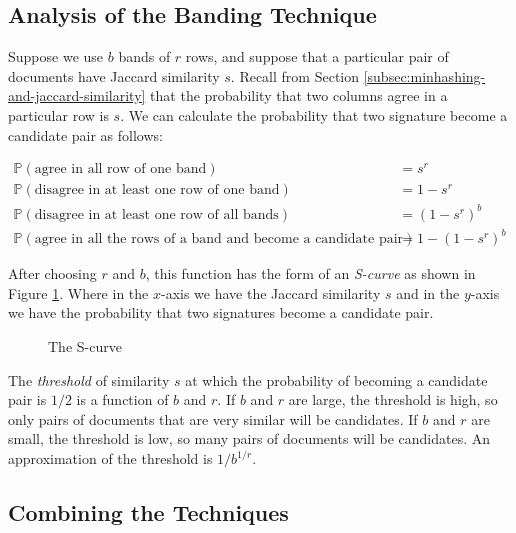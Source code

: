 \subsection{Analysis of the Banding Technique}\label{sec:analysis-banding-technique}

Suppose we use $b$ bands of $r$ rows, and suppose that a particular pair of documents have Jaccard similarity $s$. Recall from Section \ref{subsec:minhashing-and-jaccard-similarity} that the probability that two columns agree in a particular row is $s$. We can calculate the probability that two signature become a candidate pair as follows:

\begin{equation*}
    \begin{split}
        \mathbb{P}(\text{agree in all row of one band}) & = s^r \\
        \mathbb{P}(\text{disagree in at least one row of one band}) & = 1 - s^r \\
        \mathbb{P}(\text{disagree in at least one row of all bands}) & = (1 - s^r)^b \\    
        \mathbb{P}(\text{agree in all the rows of a band and become a candidate pair}) & = 1 - (1 - s^r)^b
    \end{split}
\end{equation*}

After choosing $r$ and $b$, this function has the form of an \textit{S-curve} as shown in Figure \ref{fig:4-s-curve}. Where in the $x$-axis we have the Jaccard similarity $s$ and in the $y$-axis we have the probability that two signatures become a candidate pair. 

\begin{figure}[H]
\centering
\scalebox{1}{
    
}
\caption{The S-curve}
\label{fig:4-s-curve}
\end{figure}

The \textit{threshold} of similarity $s$ at which the probability of becoming a candidate pair is $1/2$ is a function of $b$ and $r$. If $b$ and $r$ are large, the threshold is high, so only pairs of documents that are very similar will be candidates. If $b$ and $r$ are small, the threshold is low, so many pairs of documents will be candidates. An approximation of the threshold is $1/b^{1/r}$.

\subsection{Combining the Techniques}\label{sec:combining-techniques}

